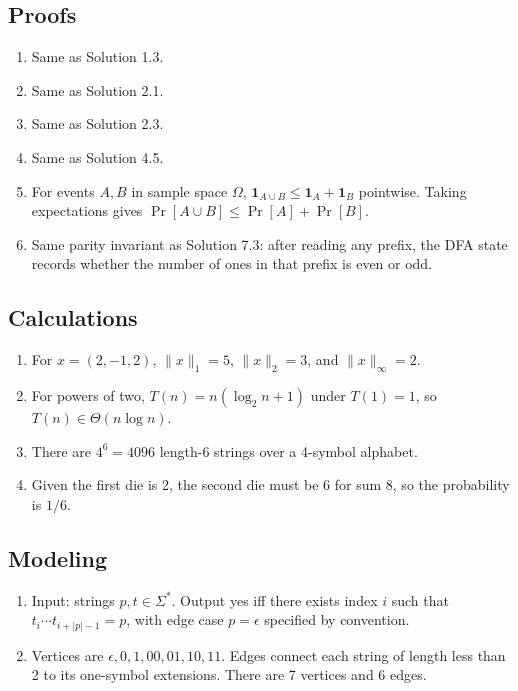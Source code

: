 \documentclass[11pt]{article}
\begin{document}
\subsection*{Proofs}
\begin{enumerate}[label=\textbf{SP\arabic*.}]
\item Same as Solution 1.3.
\item Same as Solution 2.1.
\item Same as Solution 2.3.
\item Same as Solution 4.5.
\item For events $A,B$ in sample space $\Omega$, $\mathbf{1}_{A\cup B}\le \mathbf{1}_A+\mathbf{1}_B$ pointwise. Taking expectations gives $\Pr[A\cup B]\le\Pr[A]+\Pr[B]$.
\item Same parity invariant as Solution 7.3: after reading any prefix, the DFA state records whether the number of ones in that prefix is even or odd.
\end{enumerate}

\subsection*{Calculations}
\begin{enumerate}[label=\textbf{SC\arabic*.}]
\item For $x=(2,-1,2)$, $\|x\|_1=5$, $\|x\|_2=3$, and $\|x\|_\infty=2$.
\item For powers of two, $T(n)=n(\log_2 n+1)$ under $T(1)=1$, so $T(n)\in\Theta(n\log n)$.
\item There are $4^6=4096$ length-6 strings over a 4-symbol alphabet.
\item Given the first die is 2, the second die must be 6 for sum 8, so the probability is $1/6$.
\end{enumerate}

\subsection*{Modeling}
\begin{enumerate}[label=\textbf{SM\arabic*.}]
\item Input: strings $p,t\in\Sigma^*$. Output yes iff there exists index $i$ such that $t_i\cdots t_{i+|p|-1}=p$, with edge case $p=\epsilon$ specified by convention.
\item Vertices are $\epsilon,0,1,00,01,10,11$. Edges connect each string of length less than 2 to its one-symbol extensions. There are 7 vertices and 6 edges.
\end{enumerate}
\end{document}
